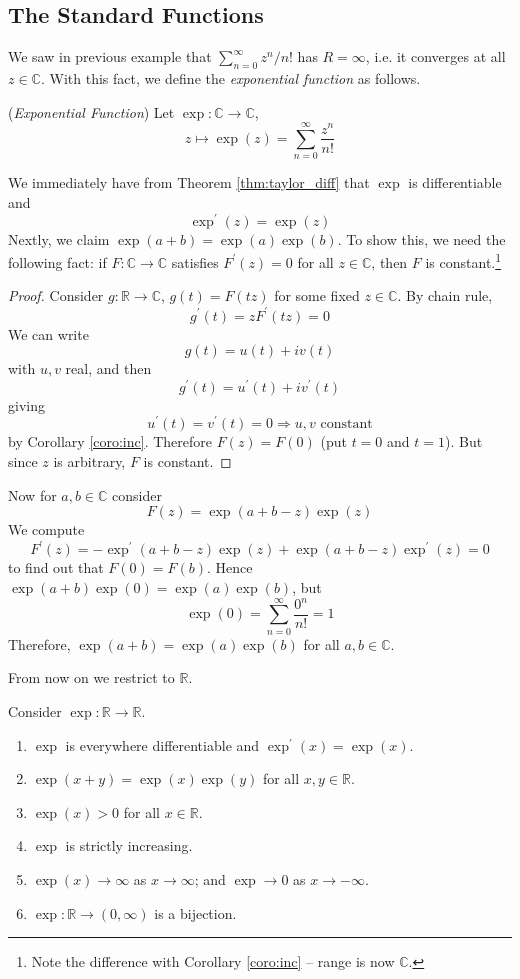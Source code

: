 \documentclass[10pt, a4paper, twoside]{report}
\begin{document}
\subsection{The Standard Functions}
We saw in previous example that \(\sum_{n=0}^{\infty}z^n/n!\) has \(R=\infty\), i.e. it converges at all \(z\in\mathbb{C}\). With this fact, we define the \emph{exponential function} as follows.
\begin{definition} (\emph{Exponential Function})
    Let \(\exp:\mathbb{C}\to\mathbb{C}\),
    \[z\mapsto \exp(z)=\sum_{n=0}^{\infty}\frac{z^n}{n!}\]
    \label{def:exp}
\end{definition}
We immediately have from Theorem \ref{thm:taylor_diff} that \(\exp\) is differentiable and 
\[\exp^\prime(z)=\exp(z)\]
Nextly, we claim \(\exp(a+b)=\exp(a)\exp(b)\). To show this, we need the following fact: if \(F:\mathbb{C}\to\mathbb{C}\) satisfies \(F^\prime(z)=0\) for all \(z\in\mathbb{C}\), then \(F\) is constant.\footnote{Note the difference with Corollary \ref{coro:inc} -- range is now \(\mathbb{C}\).}
\begin{proof}
    Consider \(g:\mathbb{R}\to\mathbb{C}\), \(g(t)=F(tz)\) for some fixed \(z\in\mathbb{C}\). By chain rule,
    \[g^\prime(t)=zF^\prime(tz)=0\]
    We can write 
    \[g(t)=u(t)+iv(t)\]
    with \(u,v\) real, and then 
    \[g^\prime(t)=u^\prime(t)+iv^\prime(t)\]
    giving
    \[u^\prime(t)=v^\prime(t)=0\Rightarrow u,v\text{  constant}\]
    by Corollary \ref{coro:inc}. Therefore \(F(z)=F(0)\) (put \(t=0\) and \(t=1\)). But since \(z\) is arbitrary, \(F\) is constant.
\end{proof}
Now for \(a,b\in\mathbb{C}\) consider 
\[F(z)=\exp(a+b-z)\exp(z)\]
We compute 
\[F^\prime(z)=-\exp^\prime(a+b-z)\exp(z)+\exp(a+b-z)\exp^\prime(z)=0\]
to find out that \(F(0)=F(b)\). Hence \(\exp(a+b)\exp(0)=\exp(a)\exp(b)\), but
\[\exp(0)=\sum_{n=0}^{\infty}\frac{0^n}{n!}=1\]
Therefore, \(\exp(a+b)=\exp(a)\exp(b)\) for all \(a,b\in\mathbb{C}\).

From now on we restrict to \(\mathbb{R}\).
\begin{theorem}
    Consider \(\exp:\mathbb{R}\to\mathbb{R}\).
    \begin{enumerate}
        \item \(\exp\) is everywhere differentiable and \(\exp^\prime(x)=\exp(x)\).
        \item \(\exp(x+y)=\exp(x)\exp(y)\) for all \(x,y\in\mathbb{R}\).
        \item \(\exp(x)>0\) for all \(x\in\mathbb{R}\).
        \item \(\exp\) is strictly increasing.
        \item \(\exp(x)\to\infty\) as \(x\to\infty\); and \(\exp\to 0\) as \(x\to-\infty\).
        \item \(\exp:\mathbb{R}\to(0,\infty)\) is a bijection.
    \end{enumerate}
    \label{thm:exp_property}
\end{theorem}
\end{document}
